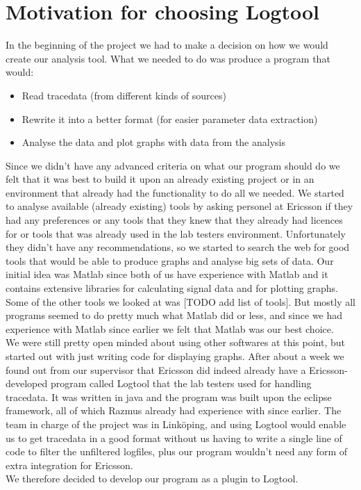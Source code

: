 \documentclass[cropmarks, frame, english]{idamasterthesis}
\begin{document}
\section{Motivation for choosing Logtool}
In the beginning of the project we had to make a decision on how we would create our analysis tool.
What we needed to do was produce a program that would:
\begin{itemize}
\item Read tracedata (from different kinds of sources)%
\item Rewrite it into a better format (for easier parameter data extraction)
\item  Analyse the data and plot graphs with data from the analysis %
\end{itemize}
Since we didn't have any advanced criteria on what our program should do we felt that it was best to build it upon an already existing project or in an environment that already had the functionality to do all we needed. \newline
We started to analyse available (already existing) tools by asking personel at Ericsson if they had any preferences or any tools that they knew that they already had licences for or tools that was already used in the lab testers environment. Unfortunately they didn't have any recommendations, so we started to search the web for good tools that would be able to produce graphs and analyse big sets of data. Our initial idea was Matlab since both of us have experience with Matlab and it contains extensive libraries for calculating signal data and for plotting graphs. Some of the other tools we looked at was [TODO add list of tools]. But mostly all programs seemed to do pretty much what Matlab did or less, and since we had experience with Matlab since earlier we felt that Matlab was our best choice. \\
We were still pretty open minded about using other softwares at this point, but started out with just writing code for displaying graphs. After about a week we found out from our supervisor that Ericsson did indeed already have a Ericsson-developed program called Logtool that the lab testers used for handling tracedata. It was written in java and the program was built upon the eclipse framework, all of which Razmus already had experience with since earlier. The team in charge of the project was in Linköping, and using Logtool would enable us to get tracedata in a good format without us having to write a single line of code to filter the unfiltered logfiles, plus our program wouldn't need any form of extra integration for Ericsson.\\
We therefore decided to develop our program as a plugin to Logtool.
\end{document}
